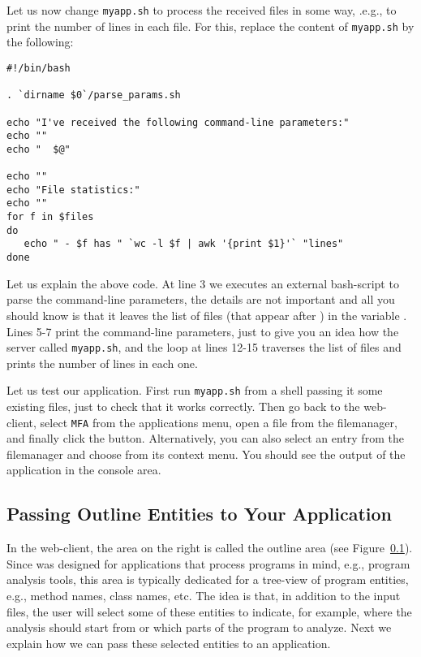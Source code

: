 Let us now change \texttt{myapp.sh} to process the received files in
some way, .e.g., to print the number of lines in each file. For this,
replace the content of \texttt{myapp.sh} by the following:

\medskip
\begin{lstlisting}[style=script]
#!/bin/bash

. `dirname $0`/parse_params.sh

echo "I've received the following command-line parameters:"
echo ""
echo "  $@"

echo ""
echo "File statistics:"
echo ""
for f in $files 
do
   echo " - $f has " `wc -l $f | awk '{print $1}'` "lines"
done
\end{lstlisting}

\medskip
\noindent
Let us explain the above code. 
%
At line 3 we executes an external bash-script to parse the
command-line parameters, the details are not important and all you
should know is that it leaves the list of files (that appear after
) in the variable .
%
Lines 5-7 print the command-line parameters, just to give you an idea
how the server called \texttt{myapp.sh}, and the loop at lines 12-15
traverses the list of files and prints the number of lines in each
one.

Let us test our application. First run \texttt{myapp.sh} from a shell
passing it some existing files, just to check that it works correctly.
%
Then go back to the web-client, select \texttt{MFA} from the
applications menu, open a file from the filemanager, and finally click
the \applybutton button. Alternatively, you can also select an entry
from the filemanager and choose \applybutton from its context
menu. You should see the output of the application in the console
area.

\subsection{Passing Outline Entities to Your Application}

In the web-client, the area on the right is called the outline area
(see Figure~\ref{}).
%
Since \ei was designed for applications that process programs in mind,
e.g., program analysis tools, this area is typically dedicated for a
tree-view of program entities, e.g., method names, class names,
etc. 
%
The idea is that, in addition to the input files, the user will select
some of these entities to indicate, for example, where the analysis
should start from or which parts of the program to analyze.
%
Next we explain how we can pass these selected entities to an
application.

